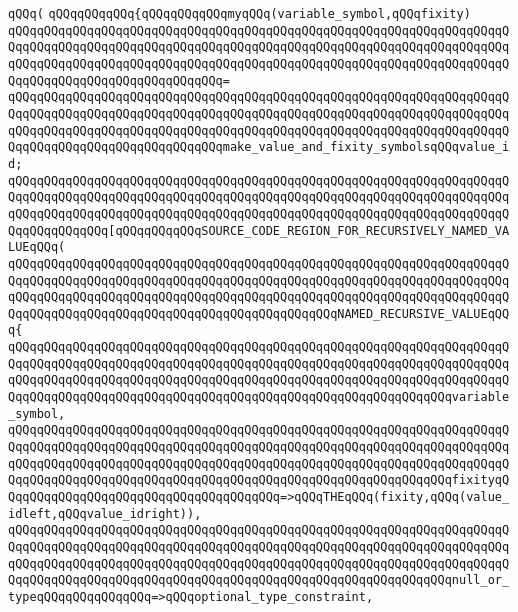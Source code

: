 \verb|qQQq(|\newline
\verb|qQQqqQQqqQQq{qQQqqQQqqQQqmyqQQq(variable_symbol,qQQqfixity)|\newline
\verb|qQQqqQQqqQQqqQQqqQQqqQQqqQQqqQQqqQQqqQQqqQQqqQQqqQQqqQQqqQQqqQQqqQQqqQQqqQQqqQQqqQQqqQQqqQQqqQQqqQQqqQQqqQQqqQQqqQQqqQQqqQQqqQQqqQQqqQQqqQQqqQQqqQQqqQQqqQQqqQQqqQQqqQQqqQQqqQQqqQQqqQQqqQQqqQQqqQQqqQQqqQQqqQQqqQQqqQQqqQQqqQQqqQQqqQQqqQQqqQQq=|\newline
\verb|qQQqqQQqqQQqqQQqqQQqqQQqqQQqqQQqqQQqqQQqqQQqqQQqqQQqqQQqqQQqqQQqqQQqqQQqqQQqqQQqqQQqqQQqqQQqqQQqqQQqqQQqqQQqqQQqqQQqqQQqqQQqqQQqqQQqqQQqqQQqqQQqqQQqqQQqqQQqqQQqqQQqqQQqqQQqqQQqqQQqqQQqqQQqqQQqqQQqqQQqqQQqqQQqqQQqqQQqqQQqqQQqqQQqqQQqqQQqqQQqmake_value_and_fixity_symbolsqQQqvalue_id;|\newline
\newline
\verb|qQQqqQQqqQQqqQQqqQQqqQQqqQQqqQQqqQQqqQQqqQQqqQQqqQQqqQQqqQQqqQQqqQQqqQQqqQQqqQQqqQQqqQQqqQQqqQQqqQQqqQQqqQQqqQQqqQQqqQQqqQQqqQQqqQQqqQQqqQQqqQQqqQQqqQQqqQQqqQQqqQQqqQQqqQQqqQQqqQQqqQQqqQQqqQQqqQQqqQQqqQQqqQQqqQQqqQQqqQQqqQQq[qQQqqQQqqQQqSOURCE_CODE_REGION_FOR_RECURSIVELY_NAMED_VALUEqQQq(|\newline
\verb|qQQqqQQqqQQqqQQqqQQqqQQqqQQqqQQqqQQqqQQqqQQqqQQqqQQqqQQqqQQqqQQqqQQqqQQqqQQqqQQqqQQqqQQqqQQqqQQqqQQqqQQqqQQqqQQqqQQqqQQqqQQqqQQqqQQqqQQqqQQqqQQqqQQqqQQqqQQqqQQqqQQqqQQqqQQqqQQqqQQqqQQqqQQqqQQqqQQqqQQqqQQqqQQqqQQqqQQqqQQqqQQqqQQqqQQqqQQqqQQqqQQqqQQqqQQqqQQqNAMED_RECURSIVE_VALUEqQQq{|\newline
\verb|qQQqqQQqqQQqqQQqqQQqqQQqqQQqqQQqqQQqqQQqqQQqqQQqqQQqqQQqqQQqqQQqqQQqqQQqqQQqqQQqqQQqqQQqqQQqqQQqqQQqqQQqqQQqqQQqqQQqqQQqqQQqqQQqqQQqqQQqqQQqqQQqqQQqqQQqqQQqqQQqqQQqqQQqqQQqqQQqqQQqqQQqqQQqqQQqqQQqqQQqqQQqqQQqqQQqqQQqqQQqqQQqqQQqqQQqqQQqqQQqqQQqqQQqqQQqqQQqqQQqqQQqqQQqqQQqvariable_symbol,|\newline
\verb|qQQqqQQqqQQqqQQqqQQqqQQqqQQqqQQqqQQqqQQqqQQqqQQqqQQqqQQqqQQqqQQqqQQqqQQqqQQqqQQqqQQqqQQqqQQqqQQqqQQqqQQqqQQqqQQqqQQqqQQqqQQqqQQqqQQqqQQqqQQqqQQqqQQqqQQqqQQqqQQqqQQqqQQqqQQqqQQqqQQqqQQqqQQqqQQqqQQqqQQqqQQqqQQqqQQqqQQqqQQqqQQqqQQqqQQqqQQqqQQqqQQqqQQqqQQqqQQqqQQqqQQqqQQqqQQqfixityqQQqqQQqqQQqqQQqqQQqqQQqqQQqqQQqqQQqqQQq=>qQQqTHEqQQq(fixity,qQQq(value_idleft,qQQqvalue_idright)),|\newline
\verb|qQQqqQQqqQQqqQQqqQQqqQQqqQQqqQQqqQQqqQQqqQQqqQQqqQQqqQQqqQQqqQQqqQQqqQQqqQQqqQQqqQQqqQQqqQQqqQQqqQQqqQQqqQQqqQQqqQQqqQQqqQQqqQQqqQQqqQQqqQQqqQQqqQQqqQQqqQQqqQQqqQQqqQQqqQQqqQQqqQQqqQQqqQQqqQQqqQQqqQQqqQQqqQQqqQQqqQQqqQQqqQQqqQQqqQQqqQQqqQQqqQQqqQQqqQQqqQQqqQQqqQQqqQQqqQQqnull_or_typeqQQqqQQqqQQqqQQq=>qQQqoptional_type_constraint,|\newline
